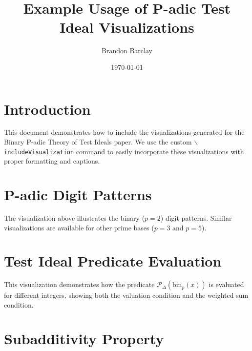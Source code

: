 \documentclass{article}
\title{Example Usage of P-adic Test Ideal Visualizations}
\author{Brandon Barclay}
\date{\today}
\begin{document}
\maketitle

\section{Introduction}

This document demonstrates how to include the visualizations generated for the Binary P-adic Theory of Test Ideals paper. We use the custom \texttt{$\backslash$includeVisualization} command to easily incorporate these visualizations with proper formatting and captions.

\section{P-adic Digit Patterns}


The visualization above illustrates the binary ($p=2$) digit patterns. Similar visualizations are available for other prime bases ($p=3$ and $p=5$).

\section{Test Ideal Predicate Evaluation}


This visualization demonstrates how the predicate $\mathcal{P}_\Delta(\text{bin}_p(x))$ is evaluated for different integers, showing both the valuation condition and the weighted sum condition.

\section{Subadditivity Property}

\end{document}
